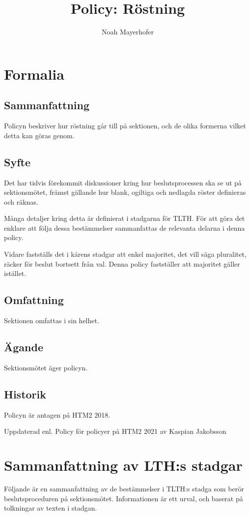 \documentclass{dsekprotokoll}
\title{Policy: Röstning}
\author{Noah Mayerhofer}
\begin{document}
\maketitle
\section{Formalia}
\subsection{Sammanfattning}
Policyn beskriver hur röstning går till på sektionen, och de olika formerna vilket detta kan göras genom.
\subsection{Syfte}
Det har tidvis förekommit diskussioner kring hur beslutsprocessen ska se ut på sektionsmötet,
främst gällande hur blank, ogiltiga och nedlagda röster definieras och räknas.


Många detaljer kring detta är definierat i stadgarna för TLTH. För att göra det enklare att följa
dessa bestämmelser sammanfattas de relevanta delarna i denna policy.


Vidare fastställs det i kårens stadgar att enkel majoritet, det vill säga pluralitet, räcker för beslut
bortsett från val. Denna policy fastställer att majoritet gäller istället.

\subsection{Omfattning}
Sektionen omfattas i sin helhet.

\subsection{Ägande}
Sektionsmötet äger policyn.

\subsection{Historik}
Policyn är antagen på HTM2 2018.

Uppdaterad enl. Policy för policyer på HTM2 2021 av Kaspian Jakobsson


\section{Sammanfattning av LTH:s stadgar}
Följande är en sammanfattning av de bestämmelser i TLTH:s stadga som berör beslutsproceduren på sektionsmötet. Informationen är ett urval, och baserat på tolkningar av texten i stadgan.
\end{document}
